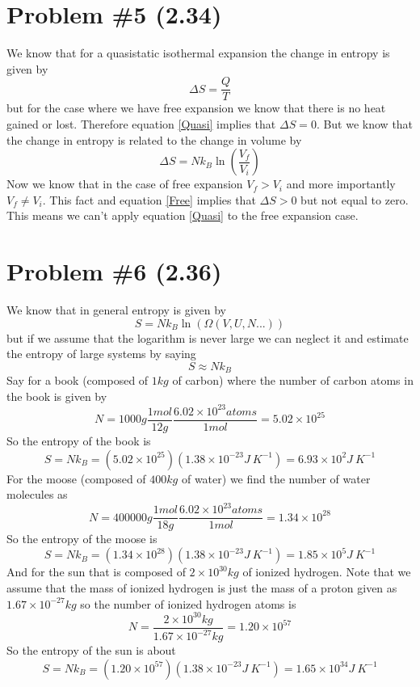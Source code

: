 \documentclass[11pt]{article}
\numberwithin{equation}{section}
\begin{document}
\section{Problem \#5 (2.34)}
We know that for a quasistatic isothermal expansion the change in entropy is given by 
\begin{equation}
\Delta S = \frac{Q}{T}
\label{Quasi}
\end{equation}
but for the case where we have free expansion we know that there is no heat gained or lost. Therefore equation \ref{Quasi} implies that $\Delta S = 0$. But we know that the change in entropy is related to the change in volume by
\begin{equation}
\Delta S = Nk_B\ln\left(\frac{V_f}{V_i}\right)
\label{Free}
\end{equation}
Now we know that in the case of free expansion $V_f>V_i$ and more importantly $V_f\ne V_i$. This fact and equation \ref{Free} implies that $\Delta S > 0$ but not equal to zero. This means we can't apply equation \ref{Quasi} to the free expansion case.

\section{Problem \#6 (2.36)}
We know that in general entropy is given by
$$S = Nk_B\ln(\Omega(V,U,N...))$$
but if we assume that the logarithm is never large we can neglect it and estimate the entropy of large systems by saying
$$S\approx Nk_B$$
Say for a book (composed of $1\unit{kg}$ of carbon) where the number of carbon atoms in the book is given by
$$N = 1000\unit{g}\frac{1\unit{mol}}{12\unit{g}}\frac{6.02\times10^{23}\unit{atoms}}{1\unit{mol}} = 5.02\times10^{25}$$
So the entropy of the book is
$$S = Nk_B = (5.02\times10^{25})(1.38\times10^{-23}\unit{J\ K^{-1}}) = 6.93\times10^{2}\unit{J\ K^{-1}}$$
For the moose (composed of $400\unit{kg}$ of water) we find the number of water molecules as
$$N = 400000\unit{g}\frac{1\unit{mol}}{18\unit{g}}\frac{6.02\times10^{23}\unit{atoms}}{1\unit{mol}} = 1.34\times10^{28}$$
So the entropy of the moose is
$$S = Nk_B = (1.34\times10^{28})(1.38\times10^{-23}\unit{J\ K^{-1}}) = 1.85\times10^{5}\unit{J\ K^{-1}}$$
And for the sun that is composed of $2\times10^{30}\unit{kg}$ of ionized hydrogen. Note that we assume that the mass of ionized hydrogen is just the mass of a proton given as $1.67\times10^{-27}\unit{kg}$ so the number of ionized hydrogen atoms is 
$$N = \frac{2\times10^{30}\unit{kg}}{1.67\times10^{-27}\unit{kg}} = 1.20\times10^{57}$$ 
So the entropy of the sun is about
$$S = Nk_B = (1.20\times10^{57})(1.38\times10^{-23}\unit{J\ K^{-1}}) = 1.65\times10^{34}\unit{J\ K^{-1}}$$
\end{document}
